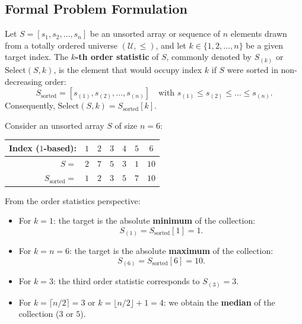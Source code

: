 \subsection{Formal Problem Formulation}
\label{subsec:selection-formulation}

\begin{definition}
Let $S = [s_1, s_2, \dots, s_n]$ be an unsorted array or sequence of $n$ elements drawn from a totally ordered universe $(\mathcal{U}, \le)$, and let $k \in \{1, 2, \dots, n\}$ be a given target index. The \textbf{$k$-th order statistic} of $S$, commonly denoted by $S_{(k)}$ or $\text{Select}(S, k)$, is the element that would occupy index $k$ if $S$ were sorted in non-decreasing order:
\begin{equation}
  S_{\text{sorted}} = [s_{(1)}, s_{(2)}, \dots, s_{(n)}] \quad \text{with } s_{(1)} \le s_{(2)} \le \dots \le s_{(n)}.
\end{equation}
Consequently, $\text{Select}(S, k) = S_{\text{sorted}}[k]$.
\end{definition}

\begin{example}
Consider an unsorted array $S$ of size $n = 6$:
\begin{center}
\begin{tabular}{rcccccc}
\toprule
\textbf{Index ($1$-based):} & $1$ & $2$ & $3$ & $4$ & $5$ & $6$ \\
\midrule
$S =$ & $2$ & $7$ & $5$ & $3$ & $1$ & $10$ \\
$S_{\text{sorted}} =$ & $1$ & $2$ & $3$ & $5$ & $7$ & $10$ \\
\bottomrule
\end{tabular}
\end{center}
From the order statistics perspective:
\begin{itemize}
  \item For $k = 1$: the target is the absolute \textbf{minimum} of the collection:
  \begin{equation}
    S_{(1)} = S_{\text{sorted}}[1] = 1.
  \end{equation}
  \item For $k = n = 6$: the target is the absolute \textbf{maximum} of the collection:
  \begin{equation}
    S_{(6)} = S_{\text{sorted}}[6] = 10.
  \end{equation}
  \item For $k = 3$: the third order statistic corresponds to $S_{(3)} = 3$.
  \item For $k = \lceil n/2 \rceil = 3$ or $k = \lfloor n/2 \rfloor + 1 = 4$: we obtain the \textbf{median} of the collection ($3$ or $5$).
\end{itemize}
\end{example}

